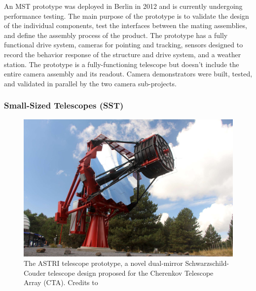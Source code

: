 An MST prototype was deployed in Berlin in 2012 and is currently undergoing performance testing. The main purpose of the prototype is to validate the design of the individual components, test the interfaces between the mating assemblies, and define the assembly process of the product. The prototype has a fully functional drive system, cameras for pointing and tracking, sensors designed to record the behavior response of the structure and drive system, and a weather station. The prototype is a fully-functioning telescope but doesn't include the entire camera assembly and its readout. Camera demonstrators were built, tested, and validated in parallel by the two camera sub-projects.

\subsubsection{Small-Sized Telescopes (SST)}
\begin{figure}[t]
\centering
\includegraphics[width=0.9\linewidth]{figures/introduction/sst.jpg}
\caption{The ASTRI telescope prototype, a novel dual-mirror Schwarzschild-Couder telescope design proposed for the Cherenkov Telescope Array (CTA). Credits to \cite{ctaobservatorywebsite}} 
\label{fig:sst}
\end{figure}
